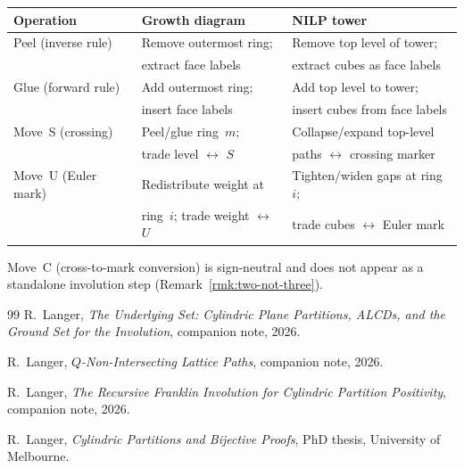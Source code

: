 \documentclass[11pt]{article}
\theoremstyle{plain}
\theoremstyle{definition}
\begin{document}
\begin{center}
\renewcommand{\arraystretch}{1.4}
\begin{tabular}{l|l|l}
\textbf{Operation} & \textbf{Growth diagram} & \textbf{NILP tower}
\\ \hline
Peel (inverse rule)
  & Remove outermost ring;
  & Remove top level of tower; \\
  & extract face labels
  & extract cubes as face labels
\\ \hline
Glue (forward rule)
  & Add outermost ring;
  & Add top level to tower; \\
  & insert face labels
  & insert cubes from face labels
\\ \hline
Move~S (crossing)
  & Peel/glue ring~$m$;
  & Collapse/expand top-level \\
  & trade level $\leftrightarrow$ $S$
  & paths $\leftrightarrow$ crossing marker
\\ \hline
Move~U (Euler mark)
  & Redistribute weight at
  & Tighten/widen gaps at ring~$i$; \\
  & ring~$i$; trade weight $\leftrightarrow$ $U$
  & trade cubes $\leftrightarrow$ Euler mark
\end{tabular}
\end{center}

\noindent
Move~C (cross-to-mark conversion) is sign-neutral and does
not appear as a standalone involution step
(Remark~\ref{rmk:two-not-three}).


\begin{thebibliography}{99}
  R.~Langer,
  \emph{The Underlying Set: Cylindric Plane Partitions, ALCDs,
  and the Ground Set for the Involution},
  companion note, 2026.

  R.~Langer,
  \emph{$Q$-Non-Intersecting Lattice Paths},
  companion note, 2026.

  R.~Langer,
  \emph{The Recursive Franklin Involution for Cylindric
  Partition Positivity},
  companion note, 2026.

  R.~Langer,
  \emph{Cylindric Partitions and Bijective Proofs},
  PhD thesis, University of Melbourne.
\end{thebibliography}
\end{document}
